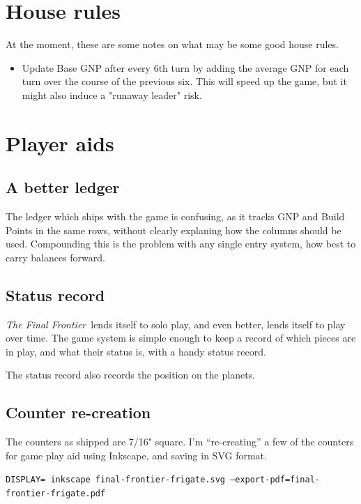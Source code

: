 \documentclass[10pt]{article}
\def\tff{{\em The Final Frontier}}
\begin{document}
\section{House rules}

At the moment, these are some notes on what may be some good house rules.

\begin{itemize}
  \item Update Base GNP after every 6th turn by adding the average GNP
    for each turn over the course of the previous six. This will speed up
    the game, but it might also induce a "runaway leader" risk.
\end{itemize}

\section{Player aids}

\subsection{A better ledger}

The ledger which ships with the game is confusing, as it tracks GNP and
Build Points in the same rows, without clearly explaning how the columns
should be used. Compounding this is the problem with any single entry system,
how best to carry balances forward.

\subsection{Status record}

\tff\ lends itself to solo play, and even better, lends itself
to play over time. The game system is simple enough to keep a record of
which pieces are in play, and what their status is, with a handy status
record.

The status record also records the position on the planets.

\subsection{Counter re-creation}

The counters as shipped are 7/16" square. I'm ``re-creating'' a few of the
counters for game play aid using Inkscape, and saving in SVG format.

{\tt DISPLAY= inkscape final-frontier-frigate.svg --export-pdf=final-frontier-frigate.pdf}
\end{document}
